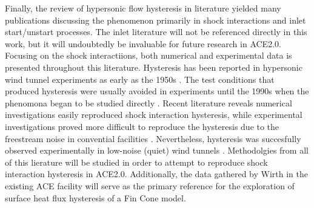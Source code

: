 Finally, the review of hypersonic flow hysteresis in literature yielded many publications discussing the phenomenon primarily in shock interactions and inlet start/unstart processes. The inlet literature will not be referenced directly in this work, but it will undoubtedly be invaluable for future research in ACE2.0. Focusing on the shock interactiions, both numerical and experimental data is presented throughout this literature. Hysteresis has been reported in hypersonic wind tunnel experiments as early as the 1950s \cite{kenworthy,beastall}. The test conditions that produced hysteresis were usually avoided in experiments until the 1990s when the phenomona began to be studied directly \cite{chpoun,ben-dor-1,durand}. Recent literature reveals numerical investigations easily reproduced shock interaction hysteresis, while experimental investigations proved more difficult to reproduce the hysteresis due to the freestream noise in convential facilities \cite{laguarda}. Nevertheless, hysteresis was succesfully observed experimentally in low-noise (quiet) wind tunnels \cite{ivanov,setoguchi,tao}. Methodolgies from all of this lierature will be studied in order to attempt to reproduce shock interaction hysteresis in ACE2.0. Additionally, the data gathered by Wirth \cite{wirth} in the existing ACE facility will serve as the primary reference for the exploration of surface heat flux hysteresis of a Fin Cone model. 
